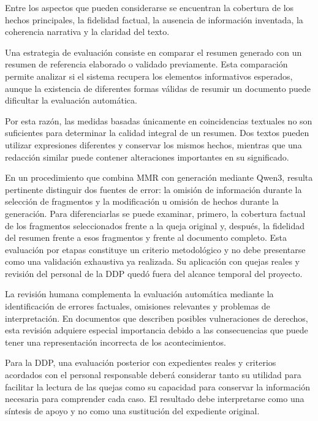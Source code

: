 Entre los aspectos que pueden considerarse se encuentran la cobertura de los hechos principales, la fidelidad factual, la ausencia de información inventada, la coherencia narrativa y la claridad del texto.

Una estrategia de evaluación consiste en comparar el resumen generado con un resumen de referencia elaborado o validado previamente. Esta comparación permite analizar si el sistema recupera los elementos informativos esperados, aunque la existencia de diferentes formas válidas de resumir un documento puede dificultar la evaluación automática.

Por esta razón, las medidas basadas únicamente en coincidencias textuales no son suficientes para determinar la calidad integral de un resumen. Dos textos pueden utilizar expresiones diferentes y conservar los mismos hechos, mientras que una redacción similar puede contener alteraciones importantes en su significado.

En un procedimiento que combina MMR con generación mediante Qwen3, resulta pertinente distinguir dos fuentes de error: la omisión de información durante la selección de fragmentos y la modificación u omisión de hechos durante la generación. Para diferenciarlas se puede examinar, primero, la cobertura factual de los fragmentos seleccionados frente a la queja original y, después, la fidelidad del resumen frente a esos fragmentos y frente al documento completo. Esta evaluación por etapas constituye un criterio metodológico y no debe presentarse como una validación exhaustiva ya realizada. Su aplicación con quejas reales y revisión del personal de la DDP quedó fuera del alcance temporal del proyecto.

La revisión humana complementa la evaluación automática mediante la identificación de errores factuales, omisiones relevantes y problemas de interpretación. En documentos que describen posibles vulneraciones de derechos, esta revisión adquiere especial importancia debido a las consecuencias que puede tener una representación incorrecta de los acontecimientos.

Para la DDP, una evaluación posterior con expedientes reales y criterios acordados con el personal responsable deberá considerar tanto su utilidad para facilitar la lectura de las quejas como su capacidad para conservar la información necesaria para comprender cada caso. El resultado debe interpretarse como una síntesis de apoyo y no como una sustitución del expediente original.